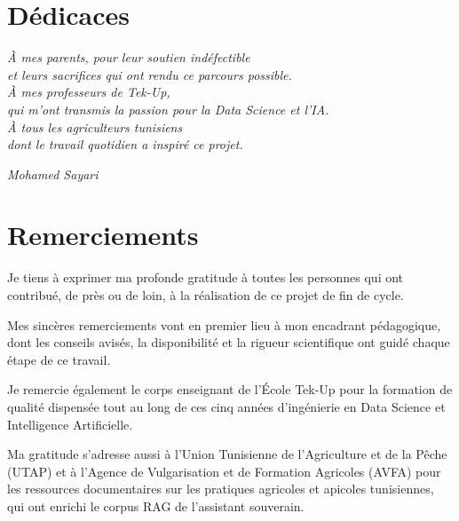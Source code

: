 \cleardoublepage

\chapter*{Dédicaces}
\thispagestyle{empty}

\begin{center}
\vspace{2cm}
{\large\itshape
À mes parents, pour leur soutien indéfectible\\
et leurs sacrifices qui ont rendu ce parcours possible.\\[1.5em]
À mes professeurs de Tek-Up,\\
qui m'ont transmis la passion pour la Data Science et l'IA.\\[1.5em]
À tous les agriculteurs tunisiens\\
dont le travail quotidien a inspiré ce projet.
}
\vspace{2cm}

\begin{flushright}
\textit{Mohamed Sayari}
\end{flushright}
\end{center}

\cleardoublepage

\chapter*{Remerciements}
\thispagestyle{empty}

Je tiens à exprimer ma profonde gratitude à toutes les personnes qui ont contribué, de près ou de loin, à la réalisation de ce projet de fin de cycle.

Mes sincères remerciements vont en premier lieu à mon encadrant pédagogique, dont les conseils avisés, la disponibilité et la rigueur scientifique ont guidé chaque étape de ce travail.

Je remercie également le corps enseignant de l'École Tek-Up pour la formation de qualité dispensée tout au long de ces cinq années d'ingénierie en Data Science et Intelligence Artificielle.

Ma gratitude s'adresse aussi à l'Union Tunisienne de l'Agriculture et de la Pêche (UTAP) et à l'Agence de Vulgarisation et de Formation Agricoles (AVFA) pour les ressources documentaires sur les pratiques agricoles et apicoles tunisiennes, qui ont enrichi le corpus RAG de l'assistant souverain.

